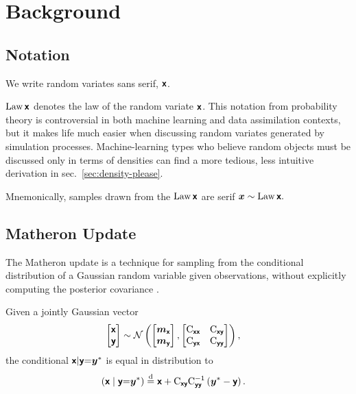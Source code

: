 \documentclass{article}
\begin{document}
\section{Background}

\subsection{Notation}

We write random variates sans serif, $\boldsymbol{\mathsf{x}}$.

$\operatorname{Law}{\boldsymbol{\mathsf{x}}}$ denotes the law of the random variate $\boldsymbol{\mathsf{x}}$.
This notation from probability theory is controversial in both machine learning and data assimilation contexts, but it makes life much easier when discussing random variates generated by simulation processes.
Machine-learning types who believe random objects must be discussed only in terms of densities can find a more tedious, less intuitive derivation in sec.~\ref{sec:density-please}.

Mnemonically, samples drawn from the $\operatorname{Law}{\boldsymbol{\mathsf{x}}}$ are serif $\boldsymbol{x}\sim\operatorname{Law}{\boldsymbol{\mathsf{x}}}.$

\subsection{Matheron Update}

The Matheron update is a technique for sampling from the conditional distribution of a Gaussian random variable given observations, without explicitly computing the posterior covariance \citep{Doucet2010Note,Wilson2020Efficiently,Wilson2021Pathwise}.

\begin{lemma}
Given a jointly Gaussian vector
\begin{align}
    \begin{bmatrix} \boldsymbol{\mathsf{x}} \\ \boldsymbol{\mathsf{y}} \end{bmatrix}
    &\sim \mathcal{N}\left(\begin{bmatrix} \boldsymbol{m}_{\boldsymbol{\mathsf{x}}} \\ \boldsymbol{m}_{\boldsymbol{\mathsf{y}}} \end{bmatrix}, \begin{bmatrix} \mathrm{C}_{\boldsymbol{\mathsf{xx}}} & \mathrm{C}_{\boldsymbol{\mathsf{xy}}} \\ \mathrm{C}_{\boldsymbol{\mathsf{yx}}} & \mathrm{C}_{\boldsymbol{\mathsf{yy}}} \end{bmatrix}\right), \label{eq:joint-gaussian}
\end{align}
the conditional $\boldsymbol{\mathsf{x}} | \boldsymbol{\mathsf{y}} {=} \boldsymbol{y}^*$ is equal in distribution to
\begin{align}
    \left(\boldsymbol{\mathsf{x}} \mid \boldsymbol{\mathsf{y}} {=} \boldsymbol{y}^*\right)
    &\stackrel{\mathrm{d}}{=} \boldsymbol{\mathsf{x}} + \mathrm{C}_{\boldsymbol{\mathsf{xy}}} \mathrm{C}_{\boldsymbol{\mathsf{yy}}}^{-1} \left( \boldsymbol{y}^* - \boldsymbol{\mathsf{y}} \right).
    \label{eq:matheron-update}
\end{align}
\end{lemma}
\end{document}
